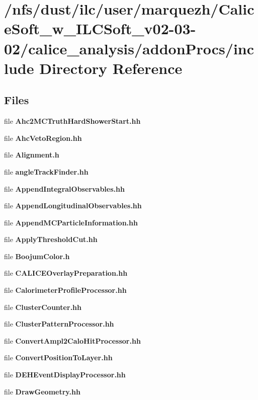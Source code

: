 \section{/nfs/dust/ilc/user/marquezh/\-Calice\-Soft\-\_\-w\-\_\-\-I\-L\-C\-Soft\-\_\-v02-\/03-\/02/calice\-\_\-analysis/addon\-Procs/include Directory Reference}
\label{dir_39ffeb98bcd5e9dd64f74e122cc0bdb8}
\subsection*{Files}
\begin{DoxyCompactItemize}
\item 
file {\bfseries Ahc2\-M\-C\-Truth\-Hard\-Shower\-Start.\-hh}
\item 
file {\bfseries Ahc\-Veto\-Region.\-hh}
\item 
file {\bfseries Alignment.\-h}
\item 
file {\bfseries angle\-Track\-Finder.\-hh}
\item 
file {\bfseries Append\-Integral\-Observables.\-hh}
\item 
file {\bfseries Append\-Longitudinal\-Observables.\-hh}
\item 
file {\bfseries Append\-M\-C\-Particle\-Information.\-hh}
\item 
file {\bfseries Apply\-Threshold\-Cut.\-hh}
\item 
file {\bfseries Boojum\-Color.\-h}
\item 
file {\bfseries C\-A\-L\-I\-C\-E\-Overlay\-Preparation.\-hh}
\item 
file {\bfseries Calorimeter\-Profile\-Processor.\-hh}
\item 
file {\bfseries Cluster\-Counter.\-hh}
\item 
file {\bfseries Cluster\-Pattern\-Processor.\-hh}
\item 
file {\bfseries Convert\-Ampl2\-Calo\-Hit\-Processor.\-hh}
\item 
file {\bfseries Convert\-Position\-To\-Layer.\-hh}
\item 
file {\bfseries D\-E\-H\-Event\-Display\-Processor.\-hh}
\item 
file {\bfseries Draw\-Geometry.\-hh}
\item 

\end{DoxyCompactItemize}
